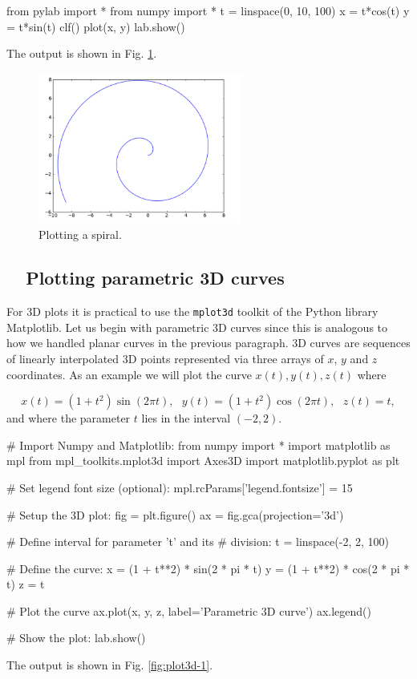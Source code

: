 \begin{bluecode}
from pylab import *
from numpy import *
t = linspace(0, 10, 100)
x = t*cos(t)
y = t*sin(t)
clf()
plot(x, y)
lab.show()
\end{bluecode}
The output is shown in Fig. \ref{fig:plot6}.

\begin{figure}[!ht]
\begin{center}
\includegraphics[width=0.6\textwidth]{imgp/plot6.png}
\end{center}
\vspace{-6mm}
\caption{Plotting a spiral.}
\label{fig:plot6}
\vspace{-0mm}
\end{figure}
\noindent

\subsection{\ \ Plotting parametric 3D curves}

For 3D plots it is practical to use the {\tt mplot3d} toolkit of the 
Python library Matplotlib. Let us begin with 
parametric 3D curves since this is analogous to how we handled planar curves in 
the previous paragraph. 3D curves are sequences of linearly interpolated 3D points
represented via three arrays of $x$, $y$ and $z$ coordinates. As an 
example we will plot the curve $x(t), y(t), z(t)$ where

$$
x(t) = (1 + t^2) \sin(2 \pi t), \ \ \ y(t) = (1 + t^2) \cos(2 \pi t), \ \ \ z(t) = t,
$$
and where the parameter $t$ lies in the interval $(-2, 2)$.

\begin{bluecode}
# Import Numpy and Matplotlib:
from numpy import *
import matplotlib as mpl
from mpl_toolkits.mplot3d import Axes3D
import matplotlib.pyplot as plt

# Set legend font size (optional):
mpl.rcParams['legend.fontsize'] = 15

# Setup the 3D plot:
fig = plt.figure()
ax = fig.gca(projection='3d')

# Define interval for parameter 't' and its
# division:
t = linspace(-2, 2, 100)

# Define the curve:
x = (1 + t**2) * sin(2 * pi * t)
y = (1 + t**2) * cos(2 * pi * t)
z = t

# Plot the curve
ax.plot(x, y, z, label='Parametric 3D curve')
ax.legend()

# Show the plot:
lab.show()
\end{bluecode}
The output is shown in Fig. \ref{fig:plot3d-1}.

